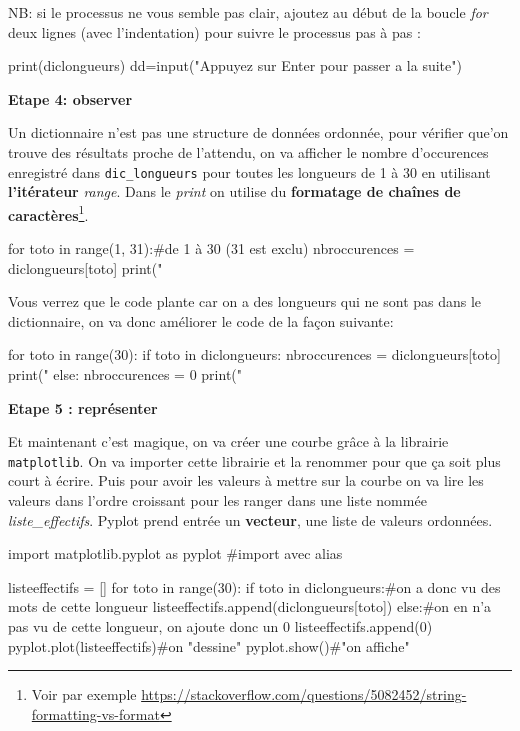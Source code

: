 NB: si le processus ne vous semble pas clair, ajoutez au début de
la boucle \textit{for} deux lignes (avec l'indentation) pour suivre
le processus pas à pas :

\begin{python} print(diclongueurs) dd=input("Appuyez sur Enter pour
passer a la suite") \end{python}

\textbf{Etape 4: observer}

Un dictionnaire n'est pas une structure de données ordonnée, pour
vérifier que'on trouve des résultats proche de l'attendu, on va afficher
le nombre d'occurences enregistré dans \texttt{dic\_longueurs} pour
toutes les longueurs de 1 à 30 en utilisant \textbf{l'itérateur} \textit{range}.
Dans le \textit{print} on utilise du \textbf{formatage de chaînes
de caractères}\footnote{Voir par exemple \url{https://stackoverflow.com/questions/5082452/string-formatting-vs-format}}.

\begin{python} for toto in range(1, 31):\#de 1 à 30 (31 est exclu)
nbroccurences = diclongueurs{[}toto{]} print("%
\end{python}

Vous verrez que le code plante car on a des longueurs qui ne sont
pas dans le dictionnaire, on va donc améliorer le code de la façon
suivante:

\begin{python} for toto in range(30): if toto in diclongueurs: nbroccurences
= diclongueurs{[}toto{]} print("%
 else: nbroccurences = 0 print("%
\end{python}

\textbf{Etape 5 : représenter}

Et maintenant c'est magique, on va créer une courbe grâce à la librairie
\texttt{matplotlib}. On va importer cette librairie et la renommer
pour que ça soit plus court à écrire. Puis pour avoir les valeurs
à mettre sur la courbe on va lire les valeurs dans l'ordre croissant
pour les ranger dans une liste nommée \textit{liste\_effectifs}. Pyplot
prend entrée un \textbf{vecteur}, une liste de valeurs ordonnées.

\begin{python} import matplotlib.pyplot as pyplot \#import avec alias

listeeffectifs = {[}{]} for toto in range(30): if toto in diclongueurs:\#on
a donc vu des mots de cette longueur listeeffectifs.append(diclongueurs{[}toto{]})
else:\#on en n'a pas vu de cette longueur, on ajoute donc un 0 listeeffectifs.append(0)
pyplot.plot(listeeffectifs)\#on "dessine" pyplot.show()\#"on affiche"

\end{python}

